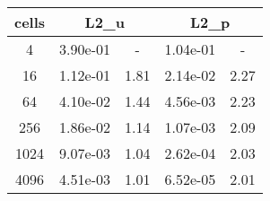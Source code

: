 \documentclass[10pt]{report}
\begin{document}
\begin{table}[H]
\begin{center}
\begin{tabular}{|c|c|c|c|c|} \hline
cells & 
\multicolumn{2}{|c|}{L2_u} & 
\multicolumn{2}{|c|}{L2_p}\\ \hline
4 & 3.90e-01 & - & 1.04e-01 & -\\ \hline
16 & 1.12e-01 & 1.81 & 2.14e-02 & 2.27\\ \hline
64 & 4.10e-02 & 1.44 & 4.56e-03 & 2.23\\ \hline
256 & 1.86e-02 & 1.14 & 1.07e-03 & 2.09\\ \hline
1024 & 9.07e-03 & 1.04 & 2.62e-04 & 2.03\\ \hline
4096 & 4.51e-03 & 1.01 & 6.52e-05 & 2.01\\ \hline
\end{tabular}
\end{center}
\end{table}
\end{document}
